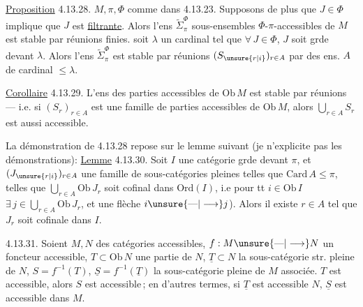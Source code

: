 \uline{Proposition} 4.13.28.  $M,\pi,\Phi$ comme dans  4.13.23. Supposons de plus que \deleted{\unsure{$\Phi$}} $J\in\Phi$ implique que $J$ est \uline{filtrante}. Alors l'ens $\widetilde{\Sigma}_{\pi}^{\Phi}$  sous-ensembles $\Phi$-$\pi$-accessibles de $M$ est stable par  réunions finies.   soit $\lambda$ un cardinal \inserted{$<\pi$} tel que \deleted{\unsure{$\Phi$}} $\forall\,J\in\Phi$, $J$ soit grde devant $\lambda$. Alors l'ens $\widetilde{\Sigma}_{\pi}^{\Phi}$ est stable par réunions  $(S_{\unsure{r|i}})_{r\in A}$  par des ens. $A$ de cardinal $\leq\lambda$.

\uline{Corollaire} 4.13.29. L'ens des parties accessibles de $\mathrm{Ob}\,M$ est stable par  réunions --- i.e. si $(S_r)_{r\in A}$ est une  famille de parties accessibles de $\mathrm{Ob}\,M$, alors $\bigcup_{r\in A}S_r$ est aussi accessible.

La démonstration de 4.13.28 repose sur le lemme suivant (je n'explicite pas les démonstrations):
\uline{Lemme} 4.13.30. Soit $I$ une catégorie grde devant $\pi$, et $(J_{\unsure{r|i}})_{r\in A}$ une famille de sous-catégories pleines telles que $\mathrm{Card}\,A\leq\pi$,  telles que $\bigcup_{r\in A}\mathrm{Ob}\,J_r$ soit cofinal dans $\mathrm{Ord}(I)$, i.e pour tt $i\in\mathrm{Ob}\,I$  $\exists\,j\in\bigcup_{r\in A}\mathrm{Ob}\,J_r$, et une flèche $i\unsure{\text{---}|\longrightarrow}j$). Alors il existe  $r\in A$ tel que $J_r$ soit cofinale dans $I$.

  4.13.31. Soient $M,N$ des catégories accessibles, $f:M\unsure{\text{---}|\longrightarrow}N$ un foncteur accessible,  $T\subset\mathrm{Ob}\,N$ une partie  de $N$, $\underline T\subset N$ la sous-catégorie str. pleine  de $N$,  $S=f^{-1}(T)$, $\underline S=f^{-1}(\underline T)$ la sous-catégorie pleine de $M$ associée.  $T$ est accessible, alors $S$ est accessible\,; en d'autres termes, si $\underline T$ est accessible  $N$, $\underline S$ est accessible dans $M$.

